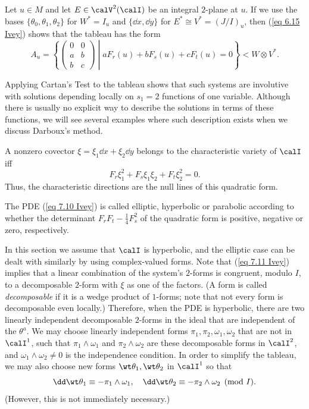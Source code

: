 Let $u\in M$ and let $E\in \calV^2(\calI)$ be an integral $2$-plane at $u$. If we use the bases $\{\theta_0,\theta_1,\theta_2\}$ for $W^\ast=I_u$ and $\{\dd x,\dd y\}$ for $E^\ast\cong V^\ast=(J\slash I)_u$, then (\ref{eq 6.15 Ivey}) shows that the tableau has the form 
\[A_u=
    \left\{
\begin{pmatrix}
    0 & 0\\
    a & b\\
    b& c
\end{pmatrix}
    \middle| aF_r(u)+bF_s(u)+cF_t(u)=0
    \right\}<W\otimes V^\ast.
\]

Applying Cartan's Test to the tableau shows that such systems are involutive with solutions depending locally on $s_1=2$ functions of one variable. Although there is usually no explicit way to describe the solutions in terms of these functions, we will see several examples where such description exists when we discuss Darboux's method.

A nonzero covector $\xi=\xi_1\dd x+\xi_2\dd y$ belongs to the characteristic variety of $\calI$ iff 
\[ F_r\xi_1^2+F_s\xi_1\xi_2+F_t\xi_2^2=0.\label{eq 7.11 Ivey}\]
Thus, the characteristic directions are the null lines of this quadratic form.

\begin{defn}
    The PDE (\ref{eq 7.10 Ivey}) is called elliptic, hyperbolic or parabolic according  to whether the determinant $F_rF_t-\frac{1}{4}F_s^2$ of the quadratic form is positive, negative or zero, respectively.
\end{defn}


In this section we assume that $\calI$ is hyperbolic, and the elliptic case can be dealt with similarly by using complex-valued forms. Note that (\ref{eq 7.11 Ivey}) implies that a linear combination of the system's $2$-forms is congruent, modulo $I$, to a decomposable $2$-form with $\xi$ as one of the factors. (A form is called \emph{decomposable} if it is a wedge product of $1$-forms; note that not every form is decomposable even locally.) Therefore, when the PDE is hyperbolic, there are two linearly independent decomposable $2$-forms in the ideal that are independent of the $\theta^a$. We may choose linearly independent forms $\pi_1,\pi_2,\omega_1,\omega_2$ that are not in $\calI^1$, such that $\pi_1\wedge\omega_1$ and $\pi_2\wedge\omega_2$ are these decomposable forms in $\calI^2$, and $\omega_1\wedge\omega_2\neq 0$ is the independence condition. In order to simplify the tableau, we may also choose new forms $\wt\theta_1,\wt\theta_2$ in $\calI^1$ so that 
\[\dd\wt\theta_1\equiv -\pi_1\wedge\omega_1,\quad \dd\wt\theta_2\equiv -\pi_2\wedge\omega_2\pmod{I}.\label{eq 7.12 Ivey}\]
(However, this is not immediately necessary.)

